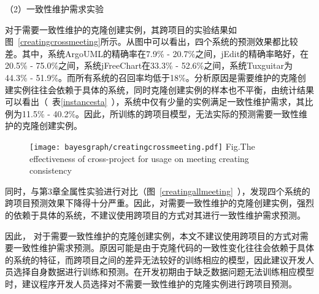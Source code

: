 
（2）一致性维护需求实验

对于需要一致性维护的克隆创建实例，其跨项目的实验结果如图~\ref{creatingcrossmeeting}所示。从图中可以看出，四个系统的预测效果都比较差。其中，系统ArgoUML的精确率在7.9\% - 20.7\%之间，jEdit的精确率略好，在20.5\% - 75.0\%之间，系统jFreeChart在33.3\% - 52.6\%之间，系统Tuxguitar为44.3\% - 51.9\%。而所有系统的召回率均低于18\%。分析原因是需要维护的克隆创建实例往往会依赖于具体的系统，同时克隆创建实例的样本也不平衡，由统计结果可以看出（~表\ref{instancesta}~），系统中仅有少量的实例满足一致性维护需求，其比例为11.5\% - 40.2\%。因此，所训练的跨项目模型，无法实际的预测需要一致性维护的克隆创建实例。

\begin{figure}[h]
\centering
\texttt{[image: bayesgraph/creatingcrossmeeting.pdf]}
{Fig.$\!$}{The effectiveness of cross-project for usage on meeting creating consistency}
\vspace{-1em}
\end{figure}

同时，与第3章全属性实验进行对比（图~\ref{creatingallmeeting}~），发现四个系统的跨项目预测效果下降得十分严重。因此，对需要一致性维护的克隆创建实例，强烈的依赖于具体的系统，不建议使用跨项目的方式对其进行一致性维护需求预测。

因此， 对于需要一致性维护的克隆创建实例，本文不建议使用跨项目的方式对需要一致性维护需求预测。原因可能是由于克隆代码的一致性变化往往会依赖于具体的系统的特征，而跨项目之间的差异无法较好的训练相应的模型，因此建议开发人员选择自身数据进行训练和预测。在开发初期由于缺乏数据问题无法训练相应模型时，建议程序开发人员选择对不需要一致性维护的克隆实例进行跨项目预测。

